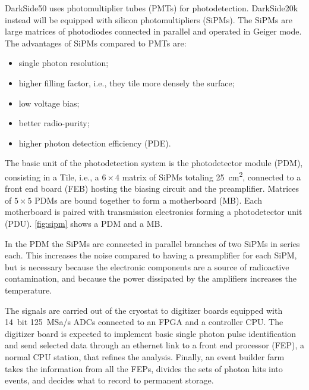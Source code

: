 DarkSide50 uses photomultiplier tubes (PMTs) for photodetection. DarkSide20k
instead will be equipped with silicon photomultipliers (SiPMs). The SiPMs are
large matrices of photodiodes connected in parallel and operated in Geiger
mode. The advantages of SiPMs compared to PMTs are:
%
\begin{itemize}
    
    \item single photon resolution;
    
    \item higher filling factor, i.e., they tile more densely the surface;
    
    \item low voltage bias;
    
    \item better radio-purity;
    
    \item higher photon detection efficiency (PDE).

\end{itemize}

The basic unit of the photodetection system is the photodetector module (PDM),
consisting in a Tile, i.e., a $6\times 4$ matrix of SiPMs totaling
\SI{25}{cm^2}, connected to a front end board (FEB) hosting the biasing circuit
and the preamplifier. Matrices of $5\times 5$ PDMs are bound together to form a
motherboard (MB). Each motherboard is paired with transmission electronics
forming a photodetector unit (PDU). \autoref{fig:sipm} shows a PDM and a MB.


In the PDM the SiPMs are connected in parallel branches of two SiPMs in series
each. This increases the noise compared to having a preamplifier for each SiPM,
but is necessary because the electronic components are a source of radioactive
contamination, and because the power dissipated by the amplifiers increases the
temperature.


The signals are carried out of the cryostat to digitizer boards equipped with
14~bit \SI{125}{MSa/s} ADCs connected to an FPGA and a controller CPU. The
digitizer board is expected to implement basic single photon pulse
identification and send selected data through an ethernet link to a front end
processor (FEP), a normal CPU station, that refines the analysis. Finally, an
event builder farm takes the information from all the FEPs, divides the sets of
photon hits into events, and decides what to record to permanent storage.

